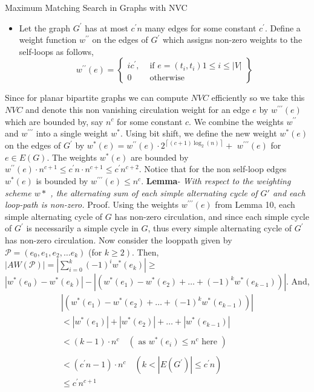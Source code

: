 \documentclass{beamer}
\begin{document}
\begin{frame}[allowframebreaks]{Maximum Matching Search in Graphs with NVC}
\begin{itemize}
   \item Let the graph $G^{\prime}$ has at most $c^{\prime} n$ many edges for some constant $c^{\prime}$. Define a weight function $w^{\prime \prime}$ on the edges of $G^{\prime}$ which assigns non-zero weights to the self-loops as follows,
   $$
   w^{\prime \prime}(e)=\left\{\begin{array}{lr}
   	i c^{\prime}, & \text { if } e=\left(t_i, t_i\right) 1 \leq i \leq|V| \\
   	0 & \text { otherwise }
   \end{array}\right\}
   $$
\end{itemize}
\break
Since for planar bipartite graphs we can compute $NVC$ efficiently so we take this $NVC$ and
denote this non vanishing circulation weight for an edge $e$ by $w^{\prime \prime \prime}(e)$ which are bounded by, say $n^c$ for some constant $c$. We combine the weights $w^{\prime \prime}$ and $w^{\prime \prime \prime}$ into a single weight $w^*$. Using bit shift, we define the new weight $w^*(e)$ on the edges of $G^{\prime}$ by $w^*(e)=w^{\prime \prime}(e) \cdot 2^{\left\lceil(c+1) \log _2(n)\right\rceil}+$ $w^{\prime \prime \prime}(e)$ for $e \in E(G)$. The weights $w^*(e)$ are bounded by $w^{\prime \prime}(e) \cdot n^{c+1} \leq c^{\prime} n \cdot n^{c+1} \leq c^{\prime} n^{c+2}$. Notice that for the non self-loop edges $w^*(e)$ is bounded by $w^{\prime \prime \prime}(e) \leq n^c$.
\break\break
\textbf{Lemma}- \textit{With respect to the weighting scheme $w*$ , the alternating sum of each simple alternating cycle of $G'$ and each loop-path is non-zero.}
Proof. Using the weights $w^{\prime \prime \prime}(e)$ from Lemma 10, each simple alternating cycle of $G$ has non-zero circulation, and since each simple cycle of $G^{\prime}$ is necessarily a simple cycle in $G$, thus every simple alternating cycle of $G^{\prime}$ has non-zero circulation. Now consider the looppath given by $\mathcal{P}=\left(e_0, e_1, e_2, \ldots e_k\right)$ (for $\left.k \geq 2\right)$. Then, $|A W(\mathcal{P})|=\left|\sum_{i=0}^k(-1)^i w^*\left(e_k\right)\right| \geq$ $\left|w^*\left(e_0\right)-w^*\left(e_k\right)\right|-\left|\left(w^*\left(e_1\right)-w^*\left(e_2\right)+\ldots+(-1)^k w^*\left(e_{k-1}\right)\right)\right|$. And,
$$
\begin{aligned}
	\left|\left(w^*\left(e_1\right)-w^*\left(e_2\right)+\ldots+(-1)^k w^*\left(e_{k-1}\right)\right)\right| \\ <\left|w^*\left(e_1\right)\right|+\left|w^*\left(e_2\right)\right|+\ldots+\left|w^*\left(e_{k-1}\right)\right| \\
	\\ <(k-1) \cdot n^c \quad\left(\text { as } w^*\left(e_i\right) \leq n^c \text { here }\right) \\
	\\ <\left(c^{\prime} n-1\right) \cdot n^c \quad\left(k<\left|E\left(G^{\prime}\right)\right| \leq c^{\prime} n\right) \\
	 \leq c^{\prime} n^{c+1}
\end{aligned}
$$


\end{frame}
\end{document}
